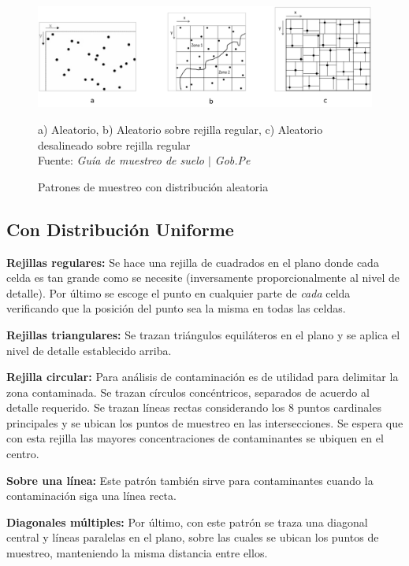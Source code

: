 \begin{figure}[H]
    \centering
    \includegraphics[width=0.7\paperwidth]{ref/random-sampling-patterns.png}
    \caption{Patrones de muestreo con distribución aleatoria}
    a) Aleatorio, b) Aleatorio sobre rejilla regular, c) Aleatorio desalineado sobre rejilla regular \\
    Fuente: \textit{Guía de muestreo de suelo $\mid$ Gob.Pe} \cite{gobpe-ministerio-del-ambiente-2014}
\end{figure}

\subsection{Con Distribución Uniforme}

\textbf{Rejillas regulares:} Se hace una rejilla de cuadrados en el plano donde cada celda es tan grande como se necesite (inversamente proporcionalmente al nivel de detalle). Por último se escoge el punto en cualquier parte de \textit{cada} celda verificando que la posición del punto sea la misma en todas las celdas.

\bigbreak

\textbf{Rejillas triangulares:} Se trazan triángulos equiláteros en el plano y se aplica el nivel de detalle establecido arriba.

\bigbreak

\textbf{Rejilla circular:} Para análisis de contaminación es de utilidad para delimitar la zona contaminada. Se trazan círculos concéntricos, separados de acuerdo al detalle requerido. Se trazan líneas rectas considerando los 8 puntos cardinales principales y se ubican los puntos de muestreo en las intersecciones. Se espera que con esta rejilla las mayores concentraciones de contaminantes se ubiquen en el centro.

\bigbreak

\textbf{Sobre una línea:} Este patrón también sirve para contaminantes cuando la contaminación siga una línea recta.

\bigbreak

\textbf{Diagonales múltiples:} Por último, con este patrón se traza una diagonal central y líneas paralelas en el plano, sobre las cuales se ubican los puntos de muestreo, manteniendo la misma distancia entre ellos.

